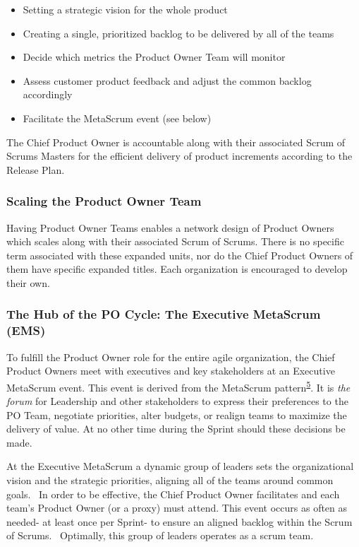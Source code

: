 \documentclass[12pt,a4paper,parskip=full]{scrartcl}
\begin{document}
\begin{itemize}
\itemsep1pt\parskip0pt
\item
  Setting a strategic vision for the whole product
\item
  Creating a single, prioritized backlog to be delivered by all of the
  teams
\item
  Decide which metrics the Product Owner Team will monitor
\item
  Assess customer product feedback and adjust the common backlog
  accordingly
\item
  Facilitate the MetaScrum event (see below)
\end{itemize}

The Chief Product Owner is accountable along with their associated Scrum
of Scrums Masters for the efficient delivery of product increments
according to the Release Plan.

\subsubsection{Scaling the Product Owner
Team}\label{scaling-the-product-owner-team}

Having Product Owner Teams enables a network design of Product Owners which scales along with their associated Scrum of Scrums. There is no specific term associated with these expanded units, nor do the Chief Product Owners of them have specific expanded titles. Each organization is encouraged to develop their own.

\subsubsection{The Hub of the PO Cycle: The Executive MetaScrum
(EMS)}\label{the-hub-of-the-po-cycle}

To fulfill the Product Owner role for the entire agile organization, the
Chief Product Owners meet with executives and key stakeholders at an
Executive MetaScrum event. This event is derived from the MetaScrum
pattern\textsuperscript{\hyperref[citation5]{5}}. It is \emph{the forum}
for Leadership and other stakeholders to express their preferences to
the PO Team, negotiate priorities, alter budgets, or realign teams to
maximize the delivery of value. At no other time during the Sprint
should these decisions be made.

At the Executive MetaScrum a dynamic group of leaders sets the
organizational vision and the strategic priorities, aligning all of the
teams around common goals.~ In order to be effective, the Chief Product
Owner facilitates and each team's Product Owner (or a proxy) must
attend. This event occurs as often as needed- at least once per Sprint-
to ensure an aligned backlog within the Scrum of Scrums.~ Optimally,
this group of leaders operates as a scrum team.
\end{document}
